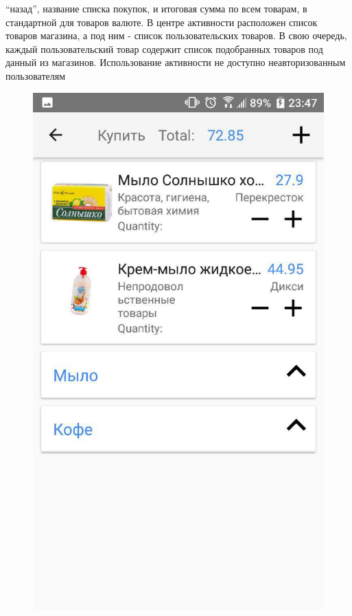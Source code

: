 \begin{my_enumerate}
        ``назад'', название списка покупок, и итоговая сумма по всем товарам, в
        стандартной для товаров валюте. В центре активности расположен список
        товаров магазина, а под ним - список пользовательских товаров. В свою
        очередь, каждый пользовательский товар содержит список подобранных
        товаров под данный из магазинов. Использование активности не доступно
        неавторизованным пользователям
\begin{figure}[h!]
    \centering
    \includegraphics[height=0.42\textheight]{./screenshots/3/shoplist.jpg}

\end{figure}
\end{my_enumerate}
